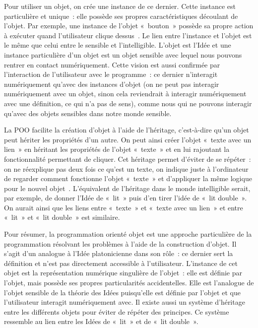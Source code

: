 \documentclass[a4paper, titlepage, 12pt]{article}
\begin{document}
	Pour utiliser un objet, on crée une instance de ce dernier. Cette instance est particulière et unique~: elle possède ses propres caractéristiques découlant de l'objet. Par exemple, une instance de l'objet «~bouton~» possède sa propre action à exécuter quand l'utilisateur clique dessus~\cite{ProgrammationOrienteeObjet2025}. Le lien entre l'instance et l'objet est le même que celui entre le sensible et l'intelligible. L'objet est l'Idée et une instance particulière d'un objet est un objet sensible avec lequel nous pouvons rentrer en contact numériquement. Cette vision est aussi confirmée par l'interaction de l'utilisateur avec le programme~: ce dernier n’interagit numériquement qu'avec des instances d'objet (on ne peut pas interagir numériquement avec un objet, sinon cela reviendrait à interagir numériquement avec une définition, ce qui n'a pas de sens), comme nous qui ne pouvons interagir qu'avec des objets sensibles dans notre monde sensible.

	La POO facilite la création d'objet à l'aide de l'héritage, c'est-à-dire qu'un objet peut hériter les propriétés d'un autre. On peut ainsi créer l'objet «~texte avec un lien~» en héritant les propriétés de l'objet «~texte~» et en lui rajoutant la fonctionnalité permettant de cliquer. Cet héritage permet d'éviter de se répéter~: on ne réexplique pas deux fois ce qu'est un texte, on indique juste à l'ordinateur de regarder comment fonctionne l'objet «~texte~» et d'appliquer la même logique pour le nouvel objet~\cite{ProgrammationOrienteeObjet2025}. L'équivalent de l'héritage dans le monde intelligible serait, par exemple, de donner l'Idée de «~lit~» puis d'en tirer l'idée de «~lit double~». On aurait ainsi que les liens entre «~texte~» et «~texte avec un lien~» et entre «~lit~» et «~lit double~» est similaire.

	Pour résumer, la programmation orienté objet est une approche particulière de la programmation résolvant les problèmes à l'aide de la construction d'objet. Il s'agit d'un analogue à l'Idée platonicienne dans son rôle~: ce dernier sert la définition et n'est pas directement accessible à l'utilisateur. L'instance de cet objet est la représentation numérique singulière de l'objet~: elle est définie par l'objet, mais possède ses propres particularités accidentelles. Elle est l'analogue de l'objet sensible de la théorie des Idées puisqu'elle est définie par l'objet et que l'utilisateur interagit numériquement avec. Il existe aussi un système d'héritage entre les différents objets pour éviter de répéter des principes. Ce système ressemble au lien entre les Idées de «~lit~» et de «~lit double~».
\end{document}
